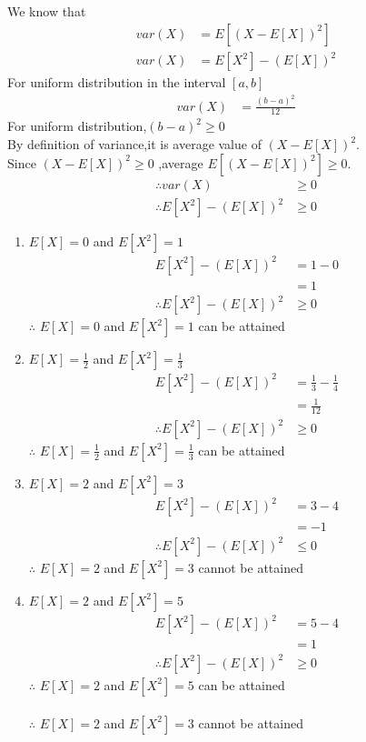 We know that
\begin{align}
var(X)&=E[(X-E[X])^2] \label{63:eq:1} \\
var(X)&=E[X^2]-(E[X])^2 \label{63:1}
\end{align}
For uniform distribution in the interval $[a,b]$
\begin{align}
var(X) &= \frac{{(b-a)}^2}{12} \label{63:eq:2}
\end{align}
For uniform distribution,$(b-a)^2 \geq 0$\\
By definition of variance,it is average value of ${(X-E[X])}^2$.\\
Since ${(X-E[X])}^2 \geq 0$ ,average $E[(X-E[X])^2] \geq 0$.
\begin{align}
\therefore var(X) & \geq 0 \label{63:2} \\
\therefore E[X^2]-(E[X])^2 & \geq 0 \label{63:3}
\end{align}
\begin{enumerate}
\item  $E[X]=0$ and $E[X^2]=1$
\begin{align}
E[X^2]-(E[X])^2 &=1 - 0\\
&=1\\
\therefore E[X^2]-(E[X])^2 &\geq 0
\end{align}
$\therefore$ $E[X]=0$ and $E[X^2]=1$ can be attained \\
\item  $E[X]=\frac{1}{2}$ and $E[X^2] =\frac{1}{3}$
\begin{align}
E[X^2]-(E[X])^2 &=\frac{1}{3} - \frac{1}{4}\\
&=\frac{1}{12}\\
\therefore E[X^2]-(E[X])^2 &\geq 0
\end{align}
$\therefore$ $E[X]=\frac{1}{2}$ and $E[X^2]=\frac{1}{3}$ can be attained \\
\item  $E[X]=2$ and $E[X^2]=3$
\begin{align}
E[X^2]-(E[X])^2 &=3 - 4\\
&=-1\\
\therefore E[X^2]-(E[X])^2 &\leq 0
\end{align}
$\therefore$ $E[X]=2$ and $E[X^2]=3$ cannot be attained \\
\item  $E[X]=2$ and $E[X^2]=5$
\begin{align}
E[X^2]-(E[X])^2 &=5 - 4\\
&=1\\
\therefore E[X^2]-(E[X])^2 &\geq 0
\end{align}
$\therefore$ $E[X]=2$ and $E[X^2]=5$ can be attained\\ \\
$\therefore$ $E[X]=2$ and $E[X^2]=3$ cannot be attained\\
\end{enumerate}